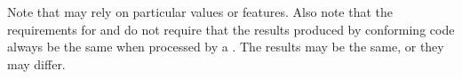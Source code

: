 %
%
%
%
%
%  
%
%
%


Note that  may rely on particular
 values or features. Also note that the
requirements for  and  do not
require that the results produced by conforming code always be the
same when processed by a . The results may be the
same, or they may differ.


